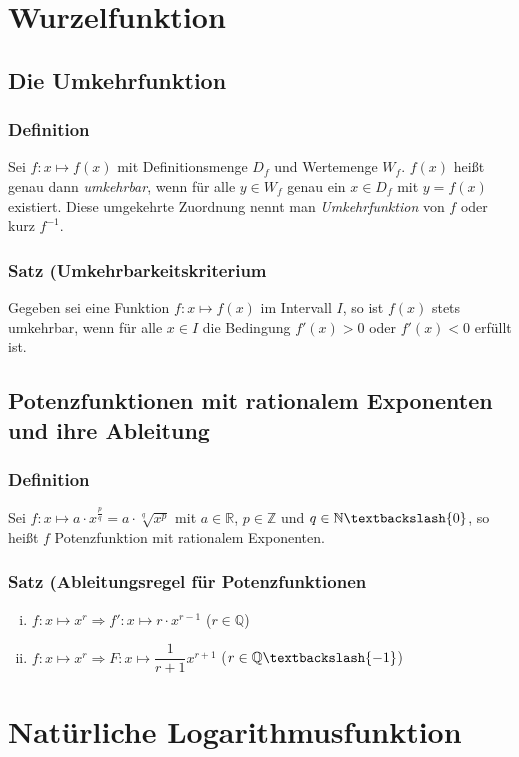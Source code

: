 \documentclass[a4paper,12pt]{article}
\newcommand{\N}{\mathbb{N}}
\newcommand{\Z}{\mathbb{Z}}
\newcommand{\Q}{\mathbb{Q}}
\newcommand{\R}{\mathbb{R}}
\begin{document}
\newpage
\section{Wurzelfunktion}
\subsection{Die Umkehrfunktion}
\subsubsection{Definition}
Sei $f:x\mapsto f(x)$ mit Definitionsmenge $D_f$ und Wertemenge $W_f$. $f(x)$ heißt genau dann \emph{umkehrbar}, wenn für alle $y\in W_f$ genau ein $x\in D_f$ mit $y=f(x)$ existiert. Diese umgekehrte Zuordnung nennt man \emph{Umkehrfunktion} von $f$ oder kurz $f^{-1}$. 

\subsubsection{Satz (Umkehrbarkeitskriterium}
Gegeben sei eine Funktion $f:x \mapsto f(x)$ im Intervall $I$, so ist $f(x)$ stets umkehrbar, wenn für alle $x\in I$ die Bedingung $f'(x)>0$ oder $f'(x)<0$ erfüllt ist.

\subsection{Potenzfunktionen mit rationalem Exponenten und ihre Ableitung}
\subsubsection{Definition}
Sei $f:x\mapsto a \cdot x^{\frac{p}{q}}=a\cdot \sqrt[q]{x^p}$ mit $a\in \R$, $p\in\Z$ und $q\in \N \textbackslash \{ 0 \}$, so heißt $f$ Potenzfunktion mit rationalem Exponenten. 

\subsubsection{Satz (Ableitungsregel für Potenzfunktionen}
\begin{enumerate}[(i)]
\item $f:x\mapsto x^r \Rightarrow f':x\mapsto r\cdot x^{r-1}$ ($r \in \Q$)
\item $f:x\mapsto x^r \Rightarrow F:x\mapsto \dfrac{1}{r+1}x^{r+1}$ ($r \in \Q \textbackslash \{ -1 \}$)
\end{enumerate}

\newpage
\section{Natürliche Logarithmusfunktion}
\end{document}
